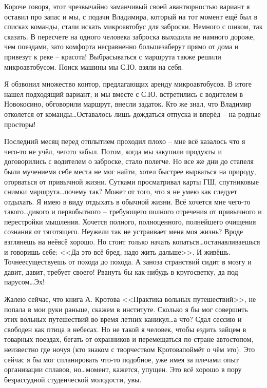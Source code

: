 Короче говоря, этот чрезвычайно заманчивый своей авантюрностью вариант я оставил про запас и мы, с подачи Владимира, который на тот момент ещё был в списках команды, стали искать микроавтобус для заброски. Немного с шиком, так сказать. В пересчете на одного человека заброска выходила не намного дороже, чем поездами, зато комфорта несравненно больше\mdash заберут прямо от дома и привезут к реке – красота! Выбрасываться с маршрута также решили микроавтобусом. Поиск машины мы С.Ю. взяли на себя.

Я обзвонил множество контор, предлагающих аренду микроавтобусов. В итоге нашел подходящий вариант, и мы вместе с С.Ю. встретились с водителем в Новокосино, обговорили маршрут, внесли задаток. Кто же знал, что Владимир отколется от команды\ldots Оставалось лишь дождаться отпуска и вперёд – на родные просторы! 

Последний месяц перед отплытием проходил плохо – мне всё казалось что я чего-то не учёл, чего\sdash то забыл. Потом, когда мы закупили продукты и договорились с водителем о заброске, стало полегче. Но все же дни до стапеля были мучением\mdash я себе места не мог найти, хотел быстрее вырваться на природу, оторваться от привычной жизни. Сутками просматривал карты ГШ, спутниковые снимки маршрута\ldots почему так? Может от того, что я не умею как следует отдыхать. Я имею в виду отдыхать в обычной жизни. Всё хочется мне чего-то такого\ldots дикого и первобытного – требующего полного отречения от привычного и перестройки мышления. Хочется полного, полноценного, полнейшего очищения сознания от тяготящего.  Неужели так не устраивает меня моя жизнь? Вроде взглянешь на неё\mdash всё хорошо. Но стоит только начать копаться\ldots останавливаешься и говоришь себе: <<Да это всё бред, надо жить дальше>>. И живёшь. Точнее\mdash существуешь от похода до похода. А заноза странствий сидит в мозгу и давит, давит, требует своего! Рвануть бы как-нибудь в кругосветку, да под парусом\ldots Эх!

Жалею сейчас, что книга А. Кротова <<Практика вольных путешествий>>, не попала в мои руки раньше, скажем в институте. Сколько я бы мог совершить этих вольных путешествий во время летних каникул\ldots а что? Сдал сессию и свободен как птица в небесах. Но не такой я человек, чтобы ездить зайцем в товарных поездах, бегать от охранников и перемещаться по стране автостопом, неизвестно где ночуя (кто знаком с творчеством Кротова\mdash поймёт о чём это). Это сейчас я бы мог спланировать что-то подобное, уже имея за плечами опыт организации сплавов, но\ldots момент, кажется, упущен. Это всё хорошо в пору безрассудной студенческой молодости, увы.

